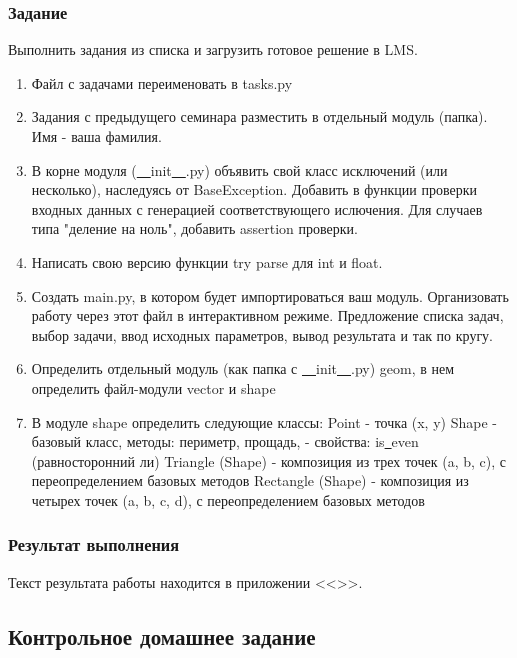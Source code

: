 \documentclass[a4paper,12pt]{article}
\begin{document}
\subsubsection{Задание}
Выполнить задания из списка и загрузить готовое решение в LMS. 
\begin{enumerate}
	\item Файл с задачами переименовать в tasks.py
	\item Задания с предыдущего семинара разместить в отдельный
модуль (папка). Имя - ваша фамилия.
	\item В корне модуля ({\underline{\ \ }}init{\underline{\ \ }}.py) объявить свой класс исключений (или несколько), наследуясь от BaseException. Добавить в функции проверки входных данных с генерацией соответствующего ислючения. Для случаев типа "деление на ноль", добавить assertion проверки.
	\item Написать свою версию функции try parse для int и float.
	\item Создать main.py, в котором будет импортироваться ваш модуль. Организовать работу через этот файл в интерактивном режиме. Предложение списка задач, выбор задачи, ввод исходных параметров, вывод результата и так по кругу.
	\item Определить отдельный модуль (как папка с {\underline{\ \ }}init{\underline{\ \ }}.py) geom, в нем определить файл-модули vector и shape
	\item В модуле shape определить следующие классы:
Point - точка (x, y)
Shape - базовый класс, методы: периметр, прощадь, - свойства:
is{\underline{\ }}even (равносторонний ли)
Triangle (Shape) - композиция из трех точек (a, b, c), с переопределением базовых методов
Rectangle (Shape) - композиция из четырех точек (a, b, c, d), с переопределением базовых методов
\end{enumerate}

\subsubsection{Результат выполнения}
Текст результата работы находится в приложении <<>>.\\

\subsection{Контрольное домашнее задание}
\end{document}
